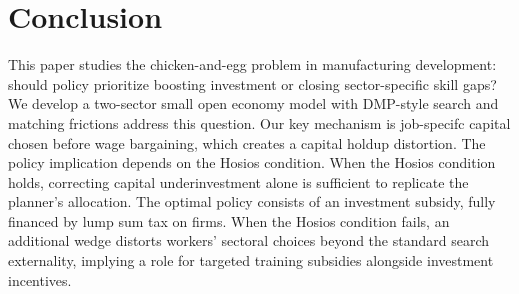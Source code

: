 \documentclass[12pt]{article} %
\newcommand{\startappendix}{%
  \appendix
  \counterwithin{equation}{section}%
  \renewcommand{\theequation}{\Alph{section}.\arabic{equation}}%
}
\theoremstyle{definition}
\begin{document}
\section{Conclusion}\label{section conclusion}

This paper studies the chicken-and-egg problem in manufacturing development: should policy prioritize boosting investment or closing sector-specific skill gaps? We develop a two-sector small open economy model with DMP-style search and matching frictions address this question.  Our key mechanism is job-specifc  capital chosen before wage bargaining, which creates a capital holdup distortion. 
The policy implication depends on the Hosios condition. When the Hosios condition holds, correcting capital underinvestment alone is sufficient to replicate the planner's allocation. The optimal policy consists of an investment subsidy, fully financed by lump sum tax on firms. When the Hosios condition fails, an additional wedge distorts workers' sectoral choices beyond the standard search externality, implying a role for targeted training subsidies alongside investment incentives.



\newpage
\startappendix
\end{document}
